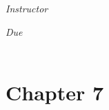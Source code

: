 \documentclass[12pt, oneside]{book}
\begin{document}
\begin{titlepage}
\begin{center}
\begin{large}
            \textit{Instructor} \\[1ex] %
            \professor

            \vspace*{1\baselineskip}

            \textit{Due}\\[1ex]
            {\scshape  \finaldate} \\[0.3\baselineskip] %

            \thispagestyle{empty}

        \end{large}
    \end{center}
\end{titlepage}


\section*{Chapter 7}
\end{document}
